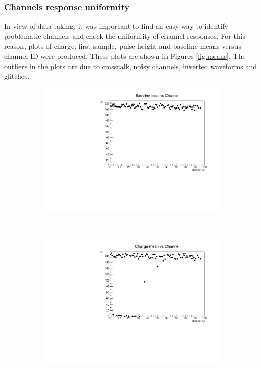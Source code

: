 \subsubsection{Channels response uniformity}
In view of data taking, it was important to find an easy way to identify problematic channels and check the uniformity of channel responses. 
For this reason, plots of charge, first sample, pulse height and baseline means versus channel ID were produced. 
These plots are shown in Figures \ref{fig:means}. 
The outliers in the plots are due to crosstalk, noisy channels, inverted waveforms and glitches.
\begin{figure}[!h]
  \centering
  \begin{subfigure}[t]{0.5\textwidth}
      \centering
      \includegraphics[width=\textwidth]{figures/pdf/bl_vs_ch1.pdf}
      \caption{}
  \end{subfigure}%
  ~ 
  \begin{subfigure}[t]{0.5\textwidth}
      \centering
      \includegraphics[width=\textwidth]{figures/pdf/q_vs_ch1.pdf}

\end{subfigure}
\end{figure}
